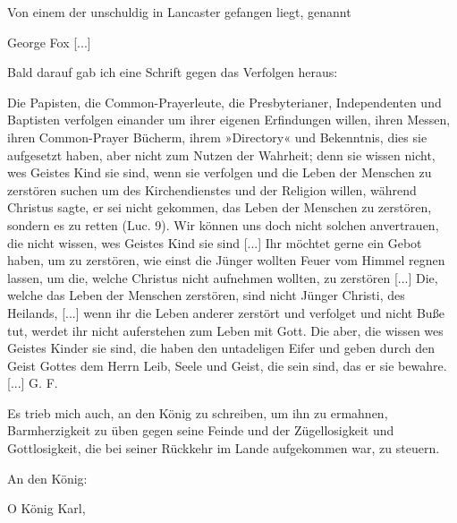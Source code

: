 Von einem der unschuldig in Lancaster gefangen liegt, genannt
\begin{center}George Fox [...]\end{center}

Bald darauf gab ich eine Schrift gegen das Verfolgen heraus:

\glqq Die Papisten, die Common-Prayerleute, die Presbyterianer,
Independenten und Baptisten verfolgen einander um ihrer eigenen
Erfindungen willen, ihren Messen, ihren Common-Prayer Bücherm,
ihrem »Directory« und Bekenntnis, dies sie aufgesetzt haben,
aber nicht zum Nutzen der Wahrheit; denn sie wissen nicht, wes
Geistes Kind sie sind, wenn sie verfolgen und die Leben der Menschen
zu zerstören suchen um des Kirchendienstes und der Religion
willen, während Christus sagte, er sei nicht gekommen, das
Leben der Menschen zu zerstören, sondern es zu retten (Luc. 9).
Wir können uns doch nicht solchen anvertrauen, die nicht wissen,
wes Geistes Kind sie sind [...] Ihr möchtet gerne ein Gebot
haben, um zu zerstören, wie einst die Jünger wollten Feuer vom
Himmel regnen lassen, um die, welche Christus nicht aufnehmen
wollten, zu zerstören [...] Die, welche das Leben der Menschen
zerstören, sind nicht Jünger Christi, des Heilands, [...] wenn ihr
die Leben anderer zerstört und verfolget und nicht Buße tut, werdet
ihr nicht auferstehen zum Leben mit Gott. Die aber, die wissen
wes Geistes Kinder sie sind, die haben den untadeligen Eifer und
geben durch den Geist Gottes dem Herrn Leib, Seele und Geist,
die sein sind, das er sie bewahre.\grqq{} [...] G. F.

Es trieb mich auch, an den König zu schreiben, um ihn zu
ermahnen, Barmherzigkeit zu üben gegen seine Feinde und der
Zügellosigkeit und Gottlosigkeit, die bei seiner Rückkehr im Lande
aufgekommen war, zu steuern.

\begin{center}An den König:\end{center}

\glqq O König Karl,

